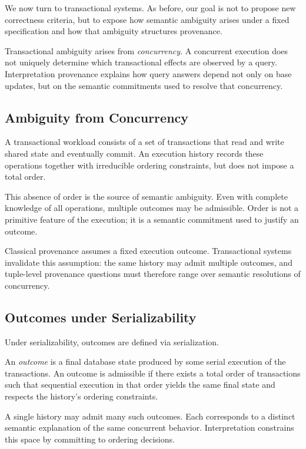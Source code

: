 \documentclass[acmsmall,nonacm]{acmart}
\theoremstyle{remark}
\numberwithin{definition}{section}
\numberwithin{theorem}{section}
\numberwithin{lemma}{section}
\numberwithin{corollary}{section}
\numberwithin{remark}{section}
\numberwithin{example}{section}
\numberwithin{observation}{section}
\numberwithin{assumption}{section}
\begin{document}
We now turn to transactional systems.
As before, our goal is not to propose new correctness criteria, but to expose how
semantic ambiguity arises under a fixed specification and how that ambiguity
structures provenance.

Transactional ambiguity arises from \emph{concurrency}.
A concurrent execution does not uniquely determine which transactional effects
are observed by a query.
Interpretation provenance explains how query answers depend not only on base
updates, but on the semantic commitments used to resolve that concurrency.

\subsection{Ambiguity from Concurrency}

A transactional workload consists of a set of transactions that read and write
shared state and eventually commit.
An execution history records these operations together with irreducible ordering
constraints, but does not impose a total order.

This absence of order is the source of semantic ambiguity.
Even with complete knowledge of all operations, multiple outcomes may be
admissible.
Order is not a primitive feature of the execution; it is a semantic commitment
used to justify an outcome.

Classical provenance assumes a fixed execution outcome.
Transactional systems invalidate this assumption: the same history may admit
multiple outcomes, and tuple-level provenance questions must therefore range over
semantic resolutions of concurrency.

\subsection{Outcomes under Serializability}

Under serializability, outcomes are defined via serialization.

An \emph{outcome} is a final database state produced by some serial execution of
the transactions.
An outcome is admissible if there exists a total order of transactions such that
sequential execution in that order yields the same final state and respects the
history’s ordering constraints.

A single history may admit many such outcomes.
Each corresponds to a distinct semantic explanation of the same concurrent
behavior.
Interpretation constrains this space by committing to ordering decisions.
\end{document}
